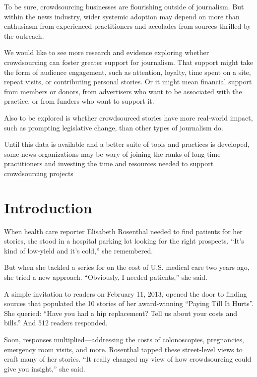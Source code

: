 \begin{itemize}
To be sure, crowdsourcing businesses are flourishing outside of journalism. But within the news industry, wider systemic adoption may depend on more than enthusiasm from experienced practitioners and accolades from sources thrilled by the outreach.  

We would like to see more research and evidence exploring whether crowdsourcing can foster greater support for journalism. That support might take the form of audience engagement, such as attention, loyalty, time spent on a site, repeat visits, or contributing personal stories. Or it might mean financial support from members or donors, from advertisers who want to be associated with the practice, or from funders who want to support it. 

Also to be explored is whether crowdsourced stories have more real-world impact, such as prompting legislative change, than other types of journalism do. 

Until this data is available and a better suite of tools and practices is developed, some news organizations may be wary of joining the ranks of long-time practitioners and investing the time and resources needed to support crowdsourcing projects



\chapter{Introduction}

When health care reporter Elisabeth Rosenthal needed to find patients for her stories, she stood in a hospital parking lot looking for the right prospects. ``It’s kind of low-yield and it’s cold,'' she remembered.\autocite{Rosenthal}

But when she tackled a series for  on the cost of U.S. medical care two years ago, she tried a new approach. “Obviously, I needed patients,” she said.
       
A simple invitation to readers on February 11, 2013, opened the door to finding sources that populated the 10 stories of her award-winning ``Paying Till It Hurts''.\autocite{Paying} She queried: ``Have you had a hip replacement? Tell us about your costs and bills.'' And 512 readers responded.

Soon, responses multiplied---addressing the costs of colonoscopies, pregnancies, emergency room visits, and more. Rosenthal tapped these street-level views to craft many of her stories. ``It really changed my view of how crowdsourcing could give you insight,'' she said.\autocite{Rosenthal} 


\end{itemize}
